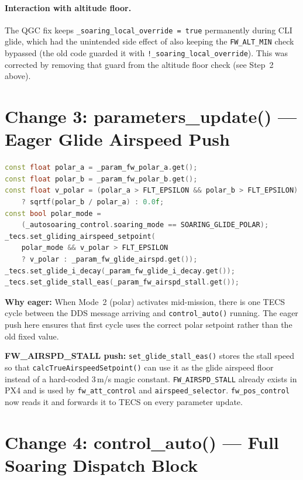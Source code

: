 \documentclass[12pt,a4paper]{article}
\begin{document}
\paragraph{Interaction with altitude floor.}
The QGC fix keeps \texttt{\_soaring\_local\_override = true} permanently during
CLI glide, which had the unintended side effect of also keeping the
\texttt{FW\_ALT\_MIN} check bypassed (the old code guarded it with
\texttt{!\_soaring\_local\_override}). This was corrected by removing that
guard from the altitude floor check (see Step~2 above).

\section{Change 3: parameters\_update() --- Eager Glide Airspeed Push}

\begin{lstlisting}[language=C++]
const float polar_a = _param_fw_polar_a.get();
const float polar_b = _param_fw_polar_b.get();
const float v_polar = (polar_a > FLT_EPSILON && polar_b > FLT_EPSILON)
    ? sqrtf(polar_b / polar_a) : 0.0f;
const bool polar_mode =
    (_autosoaring_control.soaring_mode == SOARING_GLIDE_POLAR);
_tecs.set_gliding_airspeed_setpoint(
    polar_mode && v_polar > FLT_EPSILON
    ? v_polar : _param_fw_glide_airspd.get());
_tecs.set_glide_i_decay(_param_fw_glide_i_decay.get());
_tecs.set_glide_stall_eas(_param_fw_airspd_stall.get());
\end{lstlisting}

\textbf{Why eager:} When Mode~2 (polar) activates mid-mission, there is
one TECS cycle between the DDS message arriving and \texttt{control\_auto()}
running. The eager push here ensures that first cycle uses the correct
polar setpoint rather than the old fixed value.

\textbf{FW\_AIRSPD\_STALL push:} \texttt{set\_glide\_stall\_eas()} stores the
stall speed so that \texttt{calcTrueAirspeedSetpoint()} can use it as the
glide airspeed floor instead of a hard-coded 3\,m/s magic constant.
\texttt{FW\_AIRSPD\_STALL} already exists in PX4 and is used by
\texttt{fw\_att\_control} and \texttt{airspeed\_selector}.
\texttt{fw\_pos\_control} now reads it and forwards it to TECS on every
parameter update.

\section{Change 4: control\_auto() --- Full Soaring Dispatch Block}
\end{document}
